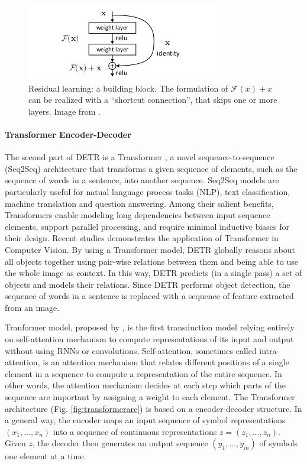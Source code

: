 \begin{figure}[h!]
	\centering
	\includegraphics[width=0.6\linewidth]{images/residualblock.png}
	\caption{Residual learning: a building block. The formulation of $\mathcal{F}(x)+x$ can be realized with a ``shortcut connection'', that skips one or more layers. Image from \cite{resnet}.}
	\label{fig:resblock}
\end{figure}

\paragraph{Transformer Encoder-Decoder} The second part of DETR is a Transformer \cite{transformer}, a novel sequence-to-sequence (Seq2Seq) architecture that transforms a given sequence of elements, such as the sequence of words in a sentence, into another sequence. Seq2Seq models are particularly useful for natual language process tasks (NLP), text classification, machine translation and
question answering. Among their salient benefits, Transformers enable modeling long dependencies between input sequence elements, support parallel processing, and require minimal inductive biases for their design. Recent studies \cite{surveytransformer} demonstrates the application of Transformer in Computer Vision. By using a Transformer model, DETR globally reasons about all objects together using pair-wise relations between them and being able to use the whole image as context. In this way, DETR predicts (in a single pass) a set of objects and
models their relations. Since DETR performs object detection, the sequence of words in a sentence is replaced with a sequence of feature extracted from an image.

Tranformer model, proposed by \citeauthor{transformer} \cite{transformer}, is the first transduction model relying entirely on self-attention mechanism to compute representations of its input and output without using RNNs or convolutions. Self-attention, sometimes called intra-attention, is an attention mechanism that relates different positions
of a single element in a sequence to compute a representation of the entire sequence. In other words, the attention mechanism decides at each step which parts of the sequence are important by assigning a weight to each element. The Transformer architecture (Fig. \ref{fig:transformerarc}) is based on a encoder-decoder structure. In a general way, the encoder maps an input sequence of symbol representations $(x_1, ..., x_n)$ into a sequence of continuous representations $z = (z_1, ..., z_n)$. Given $z$, the decoder then generates an output sequence $(y_1, ..., y_m)$ of symbols one element at a time. 

